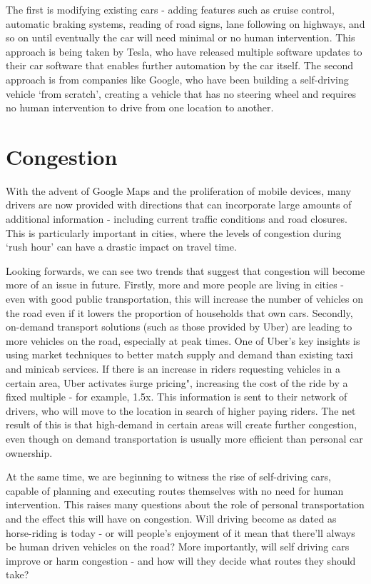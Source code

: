 \documentclass[ %
                    author={Alexander Hill},
                supervisor={Dr. Benjamin Sach},
                    degree={MEng},
                     title={MARMOSET},
                  subtitle={Multi-Agent Route Management using Online Simulation for Efficient Transportation},
                      type={research},
                      year={2016} ]{dissertation}
\begin{document}
The first is modifying existing cars - adding features such as cruise control,
automatic braking systems, reading of road signs, lane following on highways,
and so on until eventually the car will need minimal or no human intervention.
This approach is being taken by Tesla, who have released multiple software
updates to their car software that enables further automation by the car itself.
The second approach is from companies like Google, who have been building a
self-driving vehicle `from scratch', creating a vehicle that has no steering
wheel and requires no human intervention to drive from one location to another.

\section{Congestion}

With the advent of Google Maps and the proliferation of mobile devices, many
drivers are now provided with directions that can incorporate large amounts of
additional information - including current traffic conditions and road closures.
This is particularly important in cities, where the levels of congestion during
`rush hour' can have a drastic impact on travel time.

Looking forwards, we can see two trends that suggest that congestion will become
more of an issue in future. Firstly, more and more people are living in cities -
even with good public transportation, this will increase the number of vehicles
on the road even if it lowers the proportion of households that own cars.
Secondly, on-demand transport solutions (such as those provided by Uber) are
leading to more vehicles on the road, especially at peak times. One of Uber's
key insights is using market techniques to better match supply and demand than
existing taxi and minicab services. If there is an increase in riders requesting
vehicles in a certain area, Uber activates \"surge pricing", increasing the cost
of the ride by a fixed multiple - for example, 1.5x. This information is sent to
their network of drivers, who will move to the location in search of higher
paying riders. The net result of this is that high-demand in certain areas will
create further congestion, even though on demand transportation is usually more
efficient than personal car ownership.

At the same time, we are beginning to witness the rise of self-driving cars,
capable of planning and executing routes themselves with no need for human
intervention. This raises many questions about the role of personal
transportation and the effect this will have on congestion. Will driving become
as dated as horse-riding is today - or will people's enjoyment of it mean that
there'll always be human driven vehicles on the road? More importantly, will
self driving cars improve or harm congestion - and how will they decide what
routes they should take?
\end{document}
